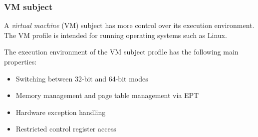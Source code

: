 \subsubsection{VM subject}
A \emph{virtual machine} (VM) subject has more control over its execution
environment. The VM profile is intended for running operating systems such as
Linux.

The execution environment of the VM subject profile has the following main
properties:

\begin{itemize}
	\item Switching between 32-bit and 64-bit modes
	\item Memory management and page table management via EPT
	\item Hardware exception handling
	\item Restricted control register access
\end{itemize}

